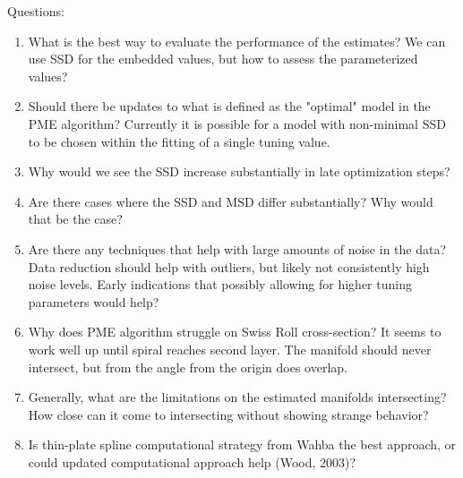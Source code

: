 \documentclass[11pt,reqno]{article}
\begin{document}
Questions:
\begin{enumerate}
  \item What is the best way to evaluate the performance of the estimates? We can use SSD for the embedded values, but how to assess the parameterized values?
  \item Should there be updates to what is defined as the "optimal" model in the PME algorithm? Currently it is possible for a model with non-minimal SSD to be chosen within the fitting of a single tuning value.
  \item Why would we see the SSD increase substantially in late optimization steps?
  \item Are there cases where the SSD and MSD differ substantially? Why would that be the case?
  \item Are there any techniques that help with large amounts of noise in the data? Data reduction should help with outliers, but likely not consistently high noise levels. Early indications that possibly allowing for higher tuning parameters would help?
  \item Why does PME algorithm struggle on Swiss Roll cross-section? It seems to work well up until spiral reaches second layer. The manifold should never intersect, but from the angle from the origin does overlap.
  \item Generally, what are the limitations on the estimated manifolds intersecting? How close can it come to intersecting without showing strange behavior?
  \item Is thin-plate spline computational strategy from Wahba the best approach, or could updated computational approach help (Wood, 2003)?
\end{enumerate}

\nocite{*}


\end{document}
